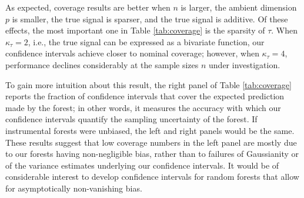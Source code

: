 \documentclass[aos]{imsart}
\theoremstyle{plain}
\theoremstyle{definition}
\theoremstyle{remark}
\begin{document}
\begin{CJK}{UTF8}{gbsn}
\begin{appendix}
As expected, coverage results are better when $n$ is larger, the ambient dimension $p$ is smaller,
the true signal is sparser, and the true signal is additive. Of these effects, the most important one
in Table \ref{tab:coverage} is the sparsity of $\tau$. When $\kappa_\tau = 2$, i.e., the true signal
can be expressed as a bivariate function, our confidence intervals achieve closer to nominal coverage;
however, when $\kappa_\tau = 4$, performance declines considerably at the sample sizes $n$ under
investigation.

To gain more intuition about this result, the right panel of Table \ref{tab:coverage} reports the fraction
of confidence intervals that cover the expected prediction made by the forest; in other words, it measures
the accuracy with which our confidence intervals quantify the sampling uncertainty of the forest.
If instrumental forests were unbiased, the left and right panels would be the same.
These results suggest that low coverage numbers in the left panel are mostly due to our forests having non-negligible bias,
rather than to failures of Gaussianity or of the variance estimates underlying our confidence intervals.
It would be of considerable interest to develop confidence intervals for random forests that allow
for asymptotically non-vanishing bias.


\end{appendix}



\end{CJK}
\end{document}

